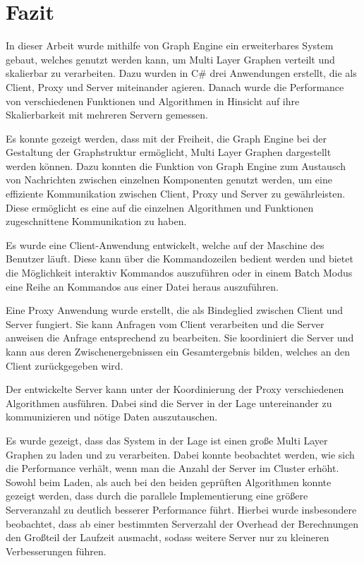 \chapter{Fazit}

In dieser Arbeit wurde mithilfe von Graph Engine ein erweiterbares System gebaut, welches genutzt werden kann, um Multi Layer Graphen verteilt und skalierbar zu verarbeiten.
Dazu wurden in C\# drei Anwendungen erstellt, die als Client, Proxy und Server miteinander agieren.
Danach wurde die Performance von verschiedenen Funktionen und Algorithmen in Hinsicht auf ihre Skalierbarkeit mit mehreren Servern gemessen.


Es konnte gezeigt werden, dass mit der Freiheit, die Graph Engine bei der Gestaltung der Graphstruktur ermöglicht, Multi Layer Graphen dargestellt werden können.
Dazu konnten die Funktion von Graph Engine zum Austausch von Nachrichten zwischen einzelnen Komponenten genutzt werden, um eine effiziente Kommunikation zwischen Client, Proxy und Server zu gewährleisten. 
Diese ermöglicht es eine auf die einzelnen Algorithmen und Funktionen zugeschnittene Kommunikation zu haben.


Es wurde eine Client-Anwendung entwickelt, welche auf der Maschine des Benutzer läuft. Diese kann über die Kommandozeilen bedient werden und bietet die Möglichkeit interaktiv Kommandos auszuführen oder in einem Batch Modus eine Reihe an Kommandos aus einer Datei heraus auszuführen.

Eine Proxy Anwendung wurde erstellt, die als Bindeglied zwischen Client und Server fungiert. Sie kann Anfragen vom Client verarbeiten und die Server anweisen die Anfrage entsprechend zu bearbeiten. Sie koordiniert die Server und kann aus deren Zwischenergebnissen ein Gesamtergebnis bilden, welches an den Client zurückgegeben wird.

Der entwickelte Server kann unter der Koordinierung der Proxy verschiedenen Algorithmen ausführen. Dabei sind die Server in der Lage untereinander zu kommunizieren und nötige Daten auszutauschen.


Es wurde gezeigt, dass das System in der Lage ist einen große Multi Layer Graphen zu laden und zu verarbeiten. Dabei konnte beobachtet werden, wie sich die Performance verhält, wenn man die Anzahl der Server im Cluster erhöht.
Sowohl beim Laden, als auch bei den beiden geprüften Algorithmen konnte gezeigt werden, dass durch die parallele Implementierung eine größere Serveranzahl zu deutlich besserer Performance führt.
Hierbei wurde insbesondere beobachtet, dass ab einer bestimmten Serverzahl der Overhead der Berechnungen den Großteil der Laufzeit ausmacht, sodass weitere Server nur zu kleineren Verbesserungen führen.


